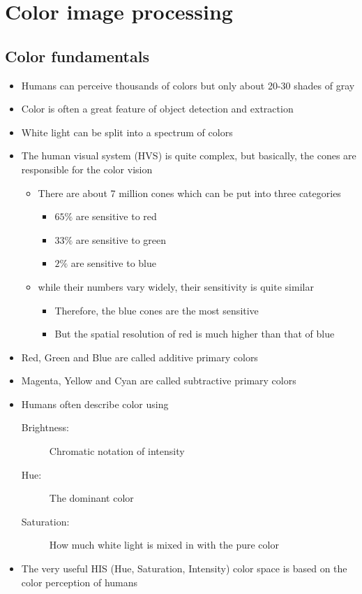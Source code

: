 \newpage
\section{Color image processing }
\subsection{Color fundamentals }
\begin{itemize}
	\item Humans can perceive thousands of colors but only about 20-30 shades of gray
	\item Color is often a great feature of object detection and extraction
	\item White light can be split into a spectrum of colors
	\item The human visual system (HVS) is quite complex, but basically, the cones are responsible for the color vision
	\begin{itemize}
		\item There are about 7 million cones which can be put into three categories
		\begin{itemize}
			\item $65\% $ are sensitive to red
			\item $33\% $ are sensitive to green
			\item $2\% $ are sensitive to blue
		\end{itemize}
		\item while their numbers vary widely, their sensitivity is quite similar
		\begin{itemize}
			\item Therefore, the blue cones are the most sensitive
			\item But the spatial resolution of red is much higher than that of blue
		\end{itemize}
	\end{itemize}
	\item Red, Green and Blue are called additive primary colors
	\item Magenta, Yellow and Cyan are called subtractive primary colors
	\item Humans often describe color using
	\begin{description}
		\item[Brightness:] Chromatic notation of intensity
		\item[Hue:] The dominant color
		\item[Saturation:] How much white light is mixed in with the pure color
	\end{description}
	\item The very useful HIS (Hue, Saturation, Intensity) color space is based on the color perception of humans	
\end{itemize}

